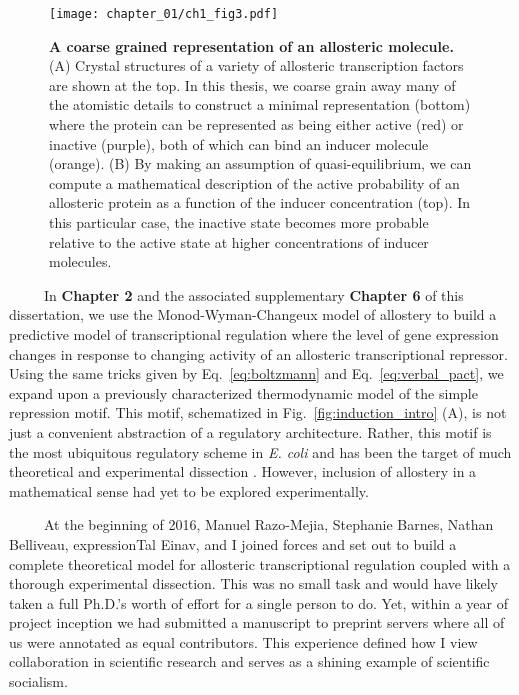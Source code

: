 \documentclass[12pt]{caltech_thesis}
\begin{document}
\hypertarget{fig:allostery}{%
\begin{figure}
\centering
\texttt{[image: chapter\_01/ch1\_fig3.pdf]}
\caption[{A coarse grained representation of an allosteric
molecule.}]{\textbf{A coarse grained representation of an allosteric
molecule.} (A) Crystal structures of a variety of allosteric
transcription factors are shown at the top. In this thesis, we coarse
grain away many of the atomistic details to construct a minimal
representation (bottom) where the protein can be represented as being
either active (red) or inactive (purple), both of which can bind an
inducer molecule (orange). (B) By making an assumption of
quasi-equilibrium, we can compute a mathematical description of the
active probability of an allosteric protein as a function of the inducer
concentration (top). In this particular case, the inactive state becomes
more probable relative to the active state at higher concentrations of
inducer molecules.}
\label{fig:allostery}
\end{figure}
}

~~~~~In \textbf{Chapter 2} and the associated supplementary
\textbf{Chapter 6} of this dissertation, we use the Monod-Wyman-Changeux
model of allostery \autocite{monod1965} to build a predictive model of
transcriptional regulation where the level of gene expression changes in
response to changing activity of an allosteric transcriptional
repressor. Using the same tricks given by Eq.~\ref{eq:boltzmann} and
Eq.~\ref{eq:verbal_pact}, we expand upon a previously characterized
thermodynamic model of the simple repression motif. This motif,
schematized in Fig.~\ref{fig:induction_intro} (A), is not just a
convenient abstraction of a regulatory architecture. Rather, this motif
is the most ubiquitous regulatory scheme in \emph{E. coli}
\autocite{gama-castro2016,ireland2020} and has been the target of much
theoretical and experimental dissection
\autocite{vilar2003,buchler2003,bintu2005,garcia2011,brewster2014,phillips2019}.
However, inclusion of allostery in a mathematical sense had yet to be
explored experimentally.

~~~~~At the beginning of 2016, Manuel Razo-Mejia, Stephanie Barnes,
Nathan Belliveau, expressionTal Einav, and I joined forces and set out
to build a complete theoretical model for allosteric transcriptional
regulation coupled with a thorough experimental dissection. This was no
small task and would have likely taken a full Ph.D.'s worth of effort
for a single person to do. Yet, within a year of project inception we
had submitted a manuscript to preprint servers where all of us were
annotated as equal contributors. This experience defined how I view
collaboration in scientific research and serves as a shining example of
scientific socialism.
\end{document}
